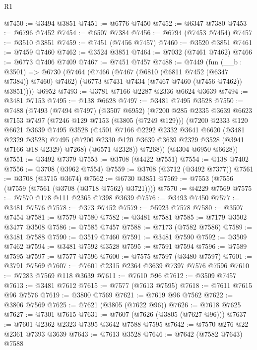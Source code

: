 \begin{lexlean}{R1}
\begin{coremodule}
@7450 := @3494 @3851
@7451 := @6776 @7450
@7452 := @6347 @7380
@7453 := @6796 @7452
@7454 := @6507 @7384
@7456 := @6794 (@7453 @7454)
@7457 := @3510 @3851
@7459 := @7451 (@7456 @7457)
@7460 := @3520 @3851
@7461 := @7459 @7460
@7462 := @3524 @3851
@7464 := @7032 (@7461 @7462)
@7466 := @6773 @7406 @7409
@7467 := @7451 @7457
@7488 := @7449
    (fun (__b : @3501) =>
    @6730
      (@7464
        (@7466
          (@7467 (@6810 (@6811 @7452 (@6347 @7384)) @7460) @7462)
          (@6773 @7431 @7434 (@7467 @7460 (@7456 @7462)) @3851))))
    @6952
@7493 := @3781 @7166 @2287 @2336 @6624 @3639
@7494 := @3481 @7153
@7495 := @138 @6628
@7497 := @3481 @7495 @3528
@7550 := @7488
    (@7493
      (@7494 @7497)
      (@3507 @6952)
      (@7200
        @285
        @2335
        @3639
        @6623
        @7153
        @7497
        (@7246 @129 @7153 (@3805 (@7249 @129)))
        (@7200
          @2333
          @120
          @6621
          @3639
          @7495
          @3528
          (@4501
            @7166
            @2292
            @2332
            @3641
            @6620
            (@3481 @2329 @3528)
            @7495
            (@7200 @2330 @120 @3639 @3639 @2329 @3528 (@3941 @7166 @18 @2329) @7268)
            (@6571 @2328))
          @7268))
      (@4304 @6950 @6628))
@7551 := @3492 @7379
@7553 := @3708 (@4422 @7551)
@7554 := @138 @7402
@7556 := @3708 (@3962 @7554)
@7559 := @3708 (@3712 (@3492 @7377))
@7561 := @3708 (@3715 @3674)
@7562 := @6730 @3851
@7569 := @7553 (@7556 (@7559 (@7561 (@3708 (@3718 @7562) @3721))))
@7570 := @4229 @7569
@7575 := @7570 @178 @111 @2365 @7398 @3639
@7576 := @3493 @7450
@7577 := @3481 @7576
@7578 := @373 @7452
@7579 := @5923 @7578
@7580 := @3507 @7454
@7581 := @7579 @7580
@7582 := @3481 @7581
@7585 := @7179 @3502 @3477 @3508
@7586 := @7585 @7457
@7588 := @7173 (@7582 @7586)
@7589 := @3481 @7588
@7590 := @3519 @7460
@7591 := @3481 @7590
@7592 := @3509 @7462
@7594 := @3481 @7592 @3528
@7595 := @7591 @7594
@7596 := @7589 @7595
@7597 := @7577 @7596
@7600 := @7575 @7597 (@3480 @7597)
@7601 := @3791 @7569
@7607 := @7601 @2315 @2364 @3639 @7397 @7576 @7596
@7610 := @7283 @7569 @118 @3639
@7611 := @7610 @96
@7612 := @3509 @7457
@7613 := @3481 @7612
@7615 := @7577 (@7613 @7595)
@7618 := @7611 @7615 @96 @7576
@7619 := @3800 @7569
@7621 := @7619 @96 @7562
@7622 := @3806 @7569
@7625 := @7621 (@3805 (@7622 @96))
@7626 := @7618 @7625
@7627 := @7301 @7615
@7631 := @7607 (@7626 (@3805 (@7627 @96)))
@7637 := @7601 @2362 @2323 @7395 @3642 @7588 @7595
@7642 := @7570 @276 @22 @2361 @7393 @3639
@7643 := @7613 @3528
@7646 := @7642 (@7582 @7643) @7588

\end{coremodule}
\end{lexlean}
